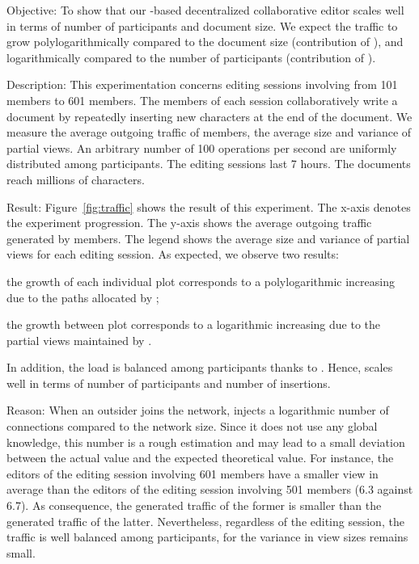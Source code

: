 \begin{asparadesc}
\item [Objective:] To show that our \LSEQ-based decentralized collaborative
  editor scales well in terms of number of participants and document size. We
  expect the traffic to grow polylogarithmically compared to the document size
  (contribution of \LSEQ), and logarithmically compared to the number of
  participants (contribution of \SPRAY).
\item [Description:] This experimentation concerns editing sessions involving
  from 101 members to 601 members. The members of each session collaboratively
  write a document by repeatedly inserting new characters at the end of the
  document. We measure the average outgoing traffic of members, the average size
  and variance of partial views. An arbitrary number of 100 operations per
  second are uniformly distributed among participants. The editing sessions last
  7 hours. The documents reach millions of characters.
\item [Result:] Figure~\ref{fig:traffic} shows the result of this experiment.
  The x-axis denotes the experiment progression. The y-axis shows the average
  outgoing traffic generated by members. The legend shows the average size and
  variance of partial views for each editing session.  As expected, we observe
  two results:
  \begin{inparaenum}[(i)]
  \item the growth of each individual plot corresponds to a polylogarithmic
    increasing due to the paths allocated by \LSEQ;
  \item the growth between plot corresponds to a logarithmic increasing due to
    the partial views maintained by \SPRAY.
  \end{inparaenum}
  In addition, the load is balanced among participants thanks to \SPRAY.  Hence,
  \CRATE scales well in terms of number of participants and number of
  insertions.
\item [Reason:] When an outsider joins the network, \SPRAY injects a logarithmic
  number of connections compared to the network size. Since it does not use any
  global knowledge, this number is a rough estimation and may lead to a small
  deviation between the actual value and the expected theoretical value. For
  instance, the editors of the editing session involving 601 members have a
  smaller view in average than the editors of the editing session involving 501
  members (6.3 against 6.7). As consequence, the generated traffic of the former
  is smaller than the generated traffic of the latter. Nevertheless, regardless
  of the editing session, the traffic is well balanced among participants, for
  the variance in view sizes remains small.


\end{asparadesc}
